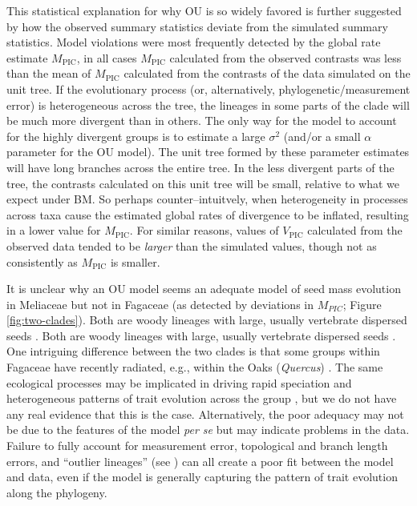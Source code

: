 \documentclass[a4paper,12pt]{article}
\begin{document}
This statistical explanation for why OU is so widely favored is further suggested by how the observed summary statistics deviate from the simulated summary statistics. Model violations were most frequently detected by the global rate estimate $M_{\text{PIC}}$, in all cases $M_{\text{PIC}}$ calculated from the observed contrasts was less than the mean of $M_{\text{PIC}}$ calculated from the contrasts of the data simulated on the unit tree. If the evolutionary process (or, alternatively, phylogenetic/measurement error) is heterogeneous across the tree, the lineages in some parts of the clade will be much more divergent than in others. The only way for the model to account for the highly divergent groups is to estimate a large $\sigma^2$ (and/or a small $\alpha$ parameter for the OU model). The unit tree formed by these parameter estimates will have long branches across the entire tree. In the less divergent parts of the tree, the contrasts calculated on this unit tree will be small, relative to what we expect under BM. So perhaps counter--intuitvely, when heterogeneity in processes across taxa cause the estimated global rates of divergence to be inflated, resulting in a lower value for $M_{\text{PIC}}$. For similar reasons, values of $V_{\text{PIC}}$ calculated from the observed data tended to be \emph{larger} than the simulated values, though not as consistently as $M_{\text{PIC}}$ is smaller. 

It is unclear why an OU model seems an adequate model of seed mass evolution in Meliaceae but not in Fagaceae (as detected by deviations in $M_{PIC}$; Figure \ref{fig:two-clades}).  Both are woody lineages with large, usually vertebrate dispersed seeds \citep{Pannell1987, Manos2001}.
Both are woody lineages with large, usually vertebrate dispersed seeds \citep{Pannell1987, Manos2001}. One intriguing difference between the two clades is that some groups within Fagaceae have recently radiated, e.g., within the Oaks (\emph{Quercus}) \citep{Simeone2013}. The same ecological processes may be implicated in driving rapid speciation and heterogeneous patterns of trait evolution across the group \citep{Schluter2000}, but we do not have any real evidence that this is the case. Alternatively, the poor adequacy may not be due to the features of the model \emph{per se} but may indicate problems in the data. Failure to fully account for measurement error, topological and branch length errors, and ``outlier lineages'' (see \citep{SlaterPennell}) can all create a poor fit between the model and data, even if the model is generally capturing the pattern of trait evolution along the phylogeny.
\end{document}
